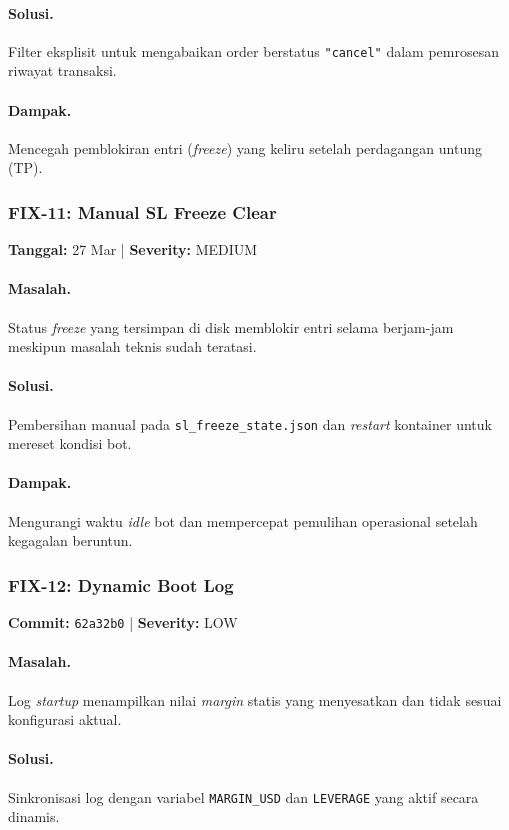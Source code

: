\documentclass[10pt,a4paper]{article}
\begin{document}
\paragraph{Solusi.} Filter eksplisit untuk mengabaikan order berstatus \texttt{"cancel"} dalam pemrosesan riwayat transaksi.
\paragraph{Dampak.} Mencegah pemblokiran entri (\textit{freeze}) yang keliru setelah perdagangan untung (TP).

\subsubsection{FIX-11: Manual SL Freeze Clear}
\textbf{Tanggal:} 27 Mar | \textbf{Severity:} MEDIUM

\paragraph{Masalah.} Status \textit{freeze} yang tersimpan di disk memblokir entri selama berjam-jam meskipun masalah teknis sudah teratasi.
\paragraph{Solusi.} Pembersihan manual pada \texttt{sl\_freeze\_state\allowbreak{}.json} dan \textit{restart} kontainer untuk mereset kondisi bot.
\paragraph{Dampak.} Mengurangi waktu \textit{idle} bot dan mempercepat pemulihan operasional setelah kegagalan beruntun.

\subsubsection{FIX-12: Dynamic Boot Log}
\textbf{Commit:} \texttt{62a32b0} | \textbf{Severity:} LOW

\paragraph{Masalah.} Log \textit{startup} menampilkan nilai \textit{margin} statis yang menyesatkan dan tidak sesuai konfigurasi aktual.
\paragraph{Solusi.} Sinkronisasi log dengan variabel \texttt{MARGIN\_USD} dan \texttt{LEVERAGE} yang aktif secara dinamis.
\end{document}
